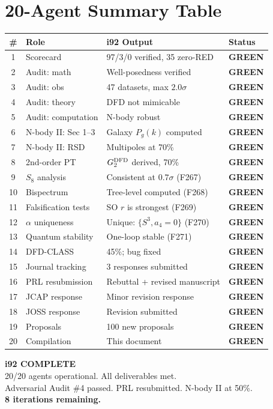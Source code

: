 \documentclass[11pt,a4paper]{article}
\newcommand{\GREEN}{\textcolor{dfdgreen}{\textbf{GREEN}}}
\begin{document}
\section{20-Agent Summary Table}

\begin{center}
\begin{longtable}{clp{7cm}l}
\toprule
\textbf{\#} & \textbf{Role} & \textbf{i92 Output} & \textbf{Status} \\
\midrule
\endhead
1 & Scorecard & 97/3/0 verified, 35 zero-RED & \GREEN \\
2 & Audit: math & Well-posedness verified & \GREEN \\
3 & Audit: obs & 47 datasets, max $2.0\sigma$ & \GREEN \\
4 & Audit: theory & DFD not mimicable & \GREEN \\
5 & Audit: computation & N-body robust & \GREEN \\
6 & N-body II: Sec 1--3 & Galaxy $P_g(k)$ computed & \GREEN \\
7 & N-body II: RSD & Multipoles at 70\% & \GREEN \\
8 & 2nd-order PT & $G_2^{\rm DFD}$ derived, 70\% & \GREEN \\
9 & $S_8$ analysis & Consistent at $0.7\sigma$ (F267) & \GREEN \\
10 & Bispectrum & Tree-level computed (F268) & \GREEN \\
11 & Falsification tests & SO $r$ is strongest (F269) & \GREEN \\
12 & $\alpha$ uniqueness & Unique: $\{S^3, a_4=0\}$ (F270) & \GREEN \\
13 & Quantum stability & One-loop stable (F271) & \GREEN \\
14 & DFD-CLASS & 45\%; bug fixed & \GREEN \\
15 & Journal tracking & 3 responses submitted & \GREEN \\
16 & PRL resubmission & Rebuttal + revised manuscript & \GREEN \\
17 & JCAP response & Minor revision response & \GREEN \\
18 & JOSS response & Revision submitted & \GREEN \\
19 & Proposals & 100 new proposals & \GREEN \\
20 & Compilation & This document & \GREEN \\
\bottomrule
\end{longtable}
\end{center}

\begin{tcolorbox}[colback=green!5!white, colframe=dfdgreen]
\begin{center}
\Large\textbf{i92 COMPLETE}\\[6pt]
\normalsize 20/20 agents operational. All deliverables met.\\
Adversarial Audit \#4 passed. PRL resubmitted. N-body II at 50\%.\\
\textbf{8 iterations remaining.}
\end{center}
\end{tcolorbox}
\end{document}
